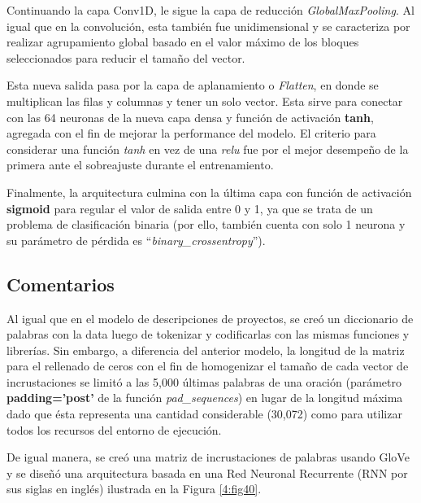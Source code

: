 Continuando la capa Conv1D, le sigue la capa de reducción \textit{GlobalMaxPooling}. Al igual que en la convolución, esta también fue unidimensional y se caracteriza por realizar agrupamiento global basado en el valor máximo de los bloques seleccionados para reducir el tamaño del vector.

Esta nueva salida pasa por la capa de aplanamiento o \textit{Flatten}, en donde se multiplican las filas y columnas y tener un solo vector. Esta sirve para conectar con las 64 neuronas de la nueva capa densa y función de activación \textbf{tanh}, agregada con el fin de mejorar la performance del modelo. El criterio para considerar una función \textit{tanh} en vez de una \textit{relu} fue por el mejor desempeño de la primera ante el sobreajuste durante el entrenamiento.

Finalmente, la arquitectura culmina con la última capa con función de activación \textbf{sigmoid} para regular el valor de salida entre 0 y 1, ya que se trata de un problema de clasificación binaria (por ello, también cuenta con solo 1 neurona y su parámetro de pérdida es “\textit{binary\_crossentropy}”).

\subsection{Comentarios}
Al igual que en el modelo de descripciones de proyectos, se creó un diccionario de palabras con la data luego de tokenizar y codificarlas con las mismas funciones y librerías. Sin embargo, a diferencia del anterior modelo, la longitud de la matriz para el rellenado de ceros con el fin de homogenizar el tamaño de cada vector de incrustaciones se limitó a las 5,000 últimas palabras de una oración (parámetro \textbf{padding='post'} de la función \textit{pad\_sequences}) en lugar de la longitud máxima dado que ésta representa una cantidad considerable (30,072) como para utilizar todos los recursos del entorno de ejecución.

De igual manera, se creó una matriz de incrustaciones de palabras usando GloVe y se diseñó una arquitectura basada en una Red Neuronal Recurrente (RNN por sus siglas en inglés) ilustrada en la Figura \ref{4:fig40}.

